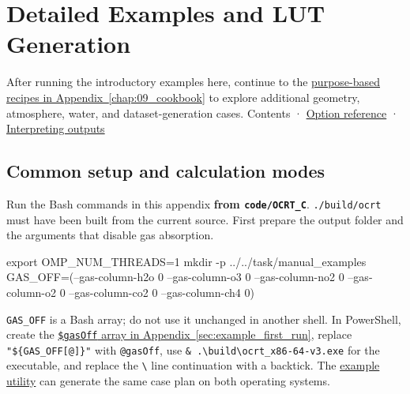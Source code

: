 \chapter{Detailed Examples and LUT Generation}
\label{chap:04_examples}
After running the introductory examples here, continue to the \hyperref[chap:09_cookbook]{purpose-based recipes in Appendix~\ref*{chap:09_cookbook}} to explore additional geometry, atmosphere, water, and dataset-generation cases.
Contents · \hyperref[chap:03_options]{Option reference} · \hyperref[chap:05_output_formats]{Interpreting outputs}

\section{Common setup and calculation modes}
\label{sec:auto:04_examples:1}
Run the Bash commands in this appendix \textbf{from \texttt{code/\allowbreak{}OCRT\_\allowbreak{}C}}. \texttt{.\allowbreak{}/\allowbreak{}build/\allowbreak{}ocrt} must have been built from the current source. First prepare the output folder and the arguments that disable gas absorption.


\par\noindent\begin{minipage}{\linewidth}
\begin{ManualCode}
export OMP_NUM_THREADS=1
mkdir -p ../../task/manual_examples
GAS_OFF=(--gas-column-h2o 0 --gas-column-o3 0 --gas-column-no2 0
         --gas-column-o2 0 --gas-column-co2 0 --gas-column-ch4 0)
\end{ManualCode}
\end{minipage}\par

\texttt{GAS\_\allowbreak{}OFF} is a Bash array; do not use it unchanged in another shell. In PowerShell, create the \hyperref[sec:example_first_run]{\texttt{\$gasOff} array in Appendix~\ref*{sec:example_first_run}}, replace \texttt{"\$\{GAS\_\allowbreak{}OFF[@]\}"} with \texttt{@gasOff}, use \texttt{\& .\allowbreak{}\textbackslash{}build\textbackslash{}ocrt\_\allowbreak{}x86-\allowbreak{}64-\allowbreak{}v3.\allowbreak{}exe} for the executable, and replace the \texttt{\textbackslash{}} line continuation with a backtick. The \hyperref[chap:examples_readme]{example utility} can generate the same case plan on both operating systems.


